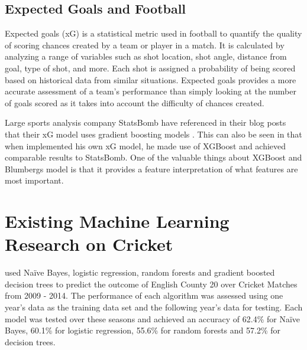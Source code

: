 \documentclass[12pt,a4paper]{report}
\theoremstyle{definition}
\begin{document}
\subsection{Expected Goals and Football}

Expected goals (xG) is a statistical metric used in football to quantify the quality of scoring chances created by a team or player in a match. 
It is calculated by analyzing a range of variables such as shot location, shot angle, distance from goal, type of shot, and more. Each shot is assigned a probability of being scored based on historical data from similar situations. 
Expected goals provides a more accurate assessment of a team's performance than simply looking at the number of goals scored as it takes into account the difficulty of chances created.

Large sports analysis company StatsBomb have referenced in their blog posts that their xG model uses gradient boosting models \citep{statsbomb2022}. 
This can also be seen in that when \citet{Blumberg2020} implemented his own xG model, he made use of XGBoost \citep{Chen2016} and achieved comparable results to StatsBomb.
One of the valuable things about XGBoost and Blumbergs model is that it provides a feature interpretation of what features are most important.

\section{Existing Machine Learning Research on Cricket} \label{sec:CrickSurvey}

\citet{KampakisStylianos2015} used Naïve Bayes, logistic regression, random forests and gradient boosted decision trees to predict the outcome of English County 20 over Cricket Matches from 2009 - 2014. 
The performance of each algorithm was assessed using one year's data as the training data set and the following year's data for testing. 
Each model was tested over these seasons and achieved an accuracy of 62.4\% for Naïve Bayes, 60.1\% for logistic regression, 55.6\% for random forests and 57.2\% for decision trees.
\end{document}
